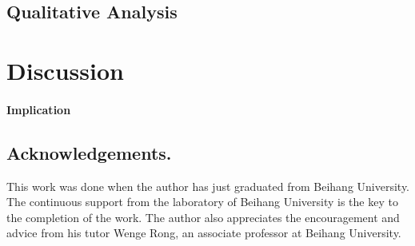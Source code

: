 \documentclass[runningheads]{llncs}
\begin{document}
    \subsection{Qualitative Analysis}

    

    \section{Discussion}

    \paragraph{Implication}


    \subsection*{Acknowledgements.}
    This work was done when the author has just graduated from Beihang University. The continuous support from the laboratory of Beihang University is the key to the completion of the work. The author also appreciates the encouragement and advice from his tutor Wenge Rong, an associate professor at Beihang University.

    
    
\end{document}
